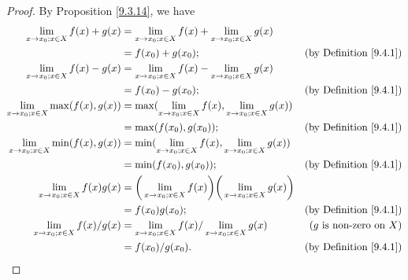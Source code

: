 \begin{proof}
    By Proposition \ref{9.3.14}, we have
    \begin{align*}
        \lim_{x \to x_0 ; x \in X} f(x) + g(x)      & = \lim_{x \to x_0 ; x \in X} f(x) + \lim_{x \to x_0 ; x \in X} g(x)                                                            \\
                                                    & = f(x_0) + g(x_0);                                                                       & \text{(by Definition \ref{9.4.1})}  \\
        \lim_{x \to x_0 ; x \in X} f(x) - g(x)      & = \lim_{x \to x_0 ; x \in X} f(x) - \lim_{x \to x_0 ; x \in X} g(x)                                                            \\
                                                    & = f(x_0) - g(x_0);                                                                       & \text{(by Definition \ref{9.4.1})}  \\
        \lim_{x \to x_0 ; x \in X} \max(f(x), g(x)) & = \max(\lim_{x \to x_0 ; x \in X} f(x), \lim_{x \to x_0 ; x \in X} g(x))                                                       \\
                                                    & = \max(f(x_0), g(x_0));                                                                  & \text{(by Definition \ref{9.4.1})}  \\
        \lim_{x \to x_0 ; x \in X} \min(f(x), g(x)) & = \min(\lim_{x \to x_0 ; x \in X} f(x), \lim_{x \to x_0 ; x \in X} g(x))                                                       \\
                                                    & = \min(f(x_0), g(x_0));                                                                  & \text{(by Definition \ref{9.4.1})}  \\
        \lim_{x \to x_0 ; x \in X} f(x) g(x)        & = \bigg(\lim_{x \to x_0 ; x \in X} f(x)\bigg)\bigg(\lim_{x \to x_0 ; x \in X} g(x)\bigg)                                       \\
                                                    & = f(x_0) g(x_0);                                                                         & \text{(by Definition \ref{9.4.1})}  \\
        \lim_{x \to x_0 ; x \in X} f(x) / g(x)      & = \lim_{x \to x_0 ; x \in X} f(x) / \lim_{x \to x_0 ; x \in X} g(x)                      & \text{(\(g\) is non-zero on \(X\))} \\
                                                    & = f(x_0) / g(x_0).                                                                       & \text{(by Definition \ref{9.4.1})}  \\
    \end{align*}
\end{proof}

